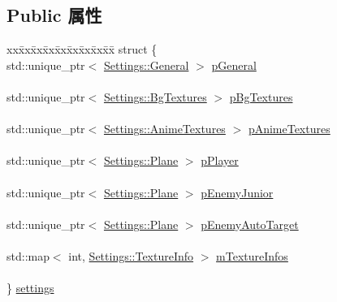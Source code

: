 \subsection*{Public 属性}
\begin{DoxyCompactItemize}
\item 
\mbox{\label{class_resources_loader_a355d825da8f96dc10cd17fc659e599ae}} 
\begin{tabbing}
xx\=xx\=xx\=xx\=xx\=xx\=xx\=xx\=xx\=\kill
struct \{\\
\>std::unique\_ptr$<$ \hyperlink{struct_settings_1_1_general}{Settings::General} $>$ \hyperlink{class_resources_loader_a65888b4ea57a744c09dc0c9e22f9f186}{pGeneral}\\
\>\\
\>std::unique\_ptr$<$ \hyperlink{struct_settings_1_1_bg_textures}{Settings::BgTextures} $>$ \hyperlink{class_resources_loader_aada194614a803df2a3680e5c5992a18a}{pBgTextures}\\
\>\\
\>std::unique\_ptr$<$ \hyperlink{struct_settings_1_1_anime_textures}{Settings::AnimeTextures} $>$ \hyperlink{class_resources_loader_a72df15c8b925035fda4edfeb52830d82}{pAnimeTextures}\\
\>\\
\>std::unique\_ptr$<$ \hyperlink{struct_settings_1_1_plane}{Settings::Plane} $>$ \hyperlink{class_resources_loader_ae874a55d363c3cb651f36e47570d30a9}{pPlayer}\\
\>\\
\>std::unique\_ptr$<$ \hyperlink{struct_settings_1_1_plane}{Settings::Plane} $>$ \hyperlink{class_resources_loader_a150dacb6180f32ab8fafadcefdc65f96}{pEnemyJunior}\\
\>\\
\>std::unique\_ptr$<$ \hyperlink{struct_settings_1_1_plane}{Settings::Plane} $>$ \hyperlink{class_resources_loader_a99ac5605a8b7fedb9c79b3f6b6d310cb}{pEnemyAutoTarget}\\
\>\\
\>std::map$<$ int, \hyperlink{struct_settings_1_1_texture_info}{Settings::TextureInfo} $>$ \hyperlink{class_resources_loader_ae364e855ac860a1404ddf324b0ef0300}{mTextureInfos}\\
\>\\
\} \hyperlink{class_resources_loader_a355d825da8f96dc10cd17fc659e599ae}{settings}\\


\end{tabbing}
\end{DoxyCompactItemize}
